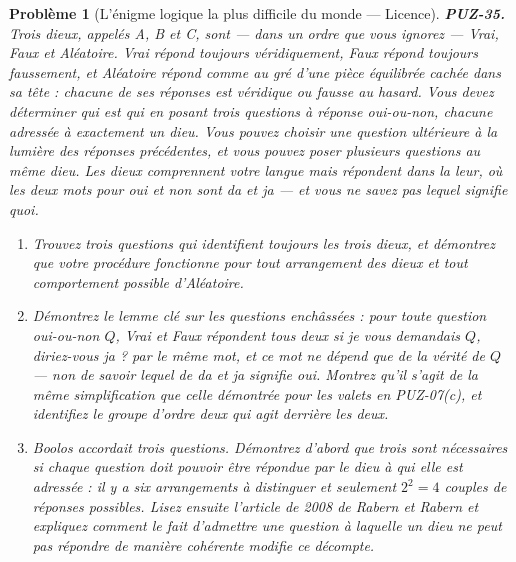 \documentclass[11pt]{article}
\newtheorem{problem}{Problème}
\begin{document}
\begin{problem}[{L'énigme logique la plus difficile du monde --- Licence}]
\textbf{PUZ-35.} Trois dieux, appelés A, B et C, sont --- dans un ordre que vous ignorez ---
Vrai, Faux et Aléatoire. Vrai répond toujours véridiquement, Faux répond toujours
faussement, et Aléatoire répond comme au gré d'une pièce équilibrée cachée dans sa tête :
chacune de ses réponses est véridique ou fausse au hasard. Vous devez déterminer qui est
qui en posant trois questions à réponse oui-ou-non, chacune adressée à exactement un dieu.
Vous pouvez choisir une question ultérieure à la lumière des réponses précédentes, et vous
pouvez poser plusieurs questions au même dieu. Les dieux comprennent votre langue mais
répondent dans la leur, où les deux mots pour oui et non sont \og{} da \fg{} et \og{} ja \fg{} --- et vous ne
savez pas lequel signifie quoi.
\begin{enumerate}
\item[(a)] Trouvez trois questions qui identifient toujours les trois dieux, et démontrez que votre
procédure fonctionne pour tout arrangement des dieux et tout comportement possible
d'Aléatoire.
\item[(b)] Démontrez le lemme clé sur les questions enchâssées : pour toute question oui-ou-non
$ Q $, Vrai et Faux répondent tous deux \og{} si je vous demandais $ Q $, diriez-vous
ja ? \fg{} par le même mot, et ce mot ne dépend que de la vérité de $ Q $ --- non de savoir
lequel de \og{} da \fg{} et \og{} ja \fg{} signifie oui. Montrez qu'il s'agit de la même simplification que
celle démontrée pour les valets en PUZ-07(c), et identifiez le groupe d'ordre deux qui agit
derrière les deux.
\item[(c)] Boolos accordait trois questions. Démontrez d'abord que trois sont nécessaires si chaque
question doit pouvoir être répondue par le dieu à qui elle est adressée : il y a six
arrangements à distinguer et seulement $ 2^{2} = 4 $ couples de réponses possibles. Lisez
ensuite l'article de 2008 de Rabern et Rabern et expliquez comment le fait d'admettre une
question à laquelle un dieu \textit{ne peut pas} répondre de manière cohérente modifie ce
décompte.
\end{enumerate}

\end{problem}
\end{document}
